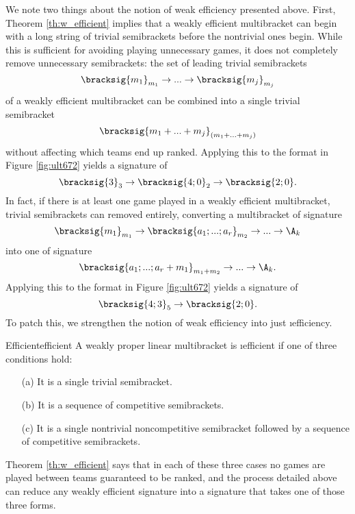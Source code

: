 {    
   

    We note two things about the notion of weak efficiency presented above. First, Theorem \ref{th:w_efficient} implies that a weakly efficient multibracket can begin with a long string of trivial semibrackets before the nontrivial ones begin. While this is sufficient for avoiding playing unnecessary games, it does not completely remove unnecessary semibrackets: the set of leading trivial semibrackets $$\bracksig{m_1}_{m_1} \to ... \to \bracksig{m_{j}}_{m_{j}}$$ of a weakly efficient multibracket can be combined into a single trivial semibracket $$\bracksig{m_1 + ... + m_{j}}_{(m_1 + ... + m_{j})}$$ without affecting which teams end up ranked. Applying this to the format in Figure \ref{fig:ult672} yields a signature of $$\bracksig{3}_3 \to \bracksig{4;0}_2 \to \bracksig{2;0}.$$ 
    In fact, if there is at least one game played in a weakly efficient multibracket, trivial semibrackets can removed entirely, converting a multibracket of signature $$\bracksig{m_1}_{m_1} \to \bracksig{a_1; ...; a_r}_{m_2} \to ... \to \A_k$$ into one of signature $$\bracksig{a_1; ...; a_r + m_1}_{m_1 + m_2} \to ... \to \A_k.$$ 
    Applying this to the format in Figure \ref{fig:ult672} yields a signature of $$\bracksig{4;3}_5 \to \bracksig{2;0}.$$
    To patch this, we strengthen the notion of weak efficiency into just \i{efficiency.}

    \begin{definition}{Efficient}{efficient}
        A weakly proper linear multibracket is \i{efficient} if one of three conditions hold:
        \begin{enumerate}
            \item[(a)] It is a single trivial semibracket.
            \item[(b)] It is a sequence of competitive semibrackets.
            \item[(c)] It is a single nontrivial noncompetitive semibracket followed by a sequence of competitive semibrackets.
        \end{enumerate}
    \end{definition}

    Theorem \ref{th:w_efficient} says that in each of these three cases no games are played between teams guaranteed to be ranked, and the process detailed above can reduce any weakly efficient signature into a signature that takes one of those three forms.

}
